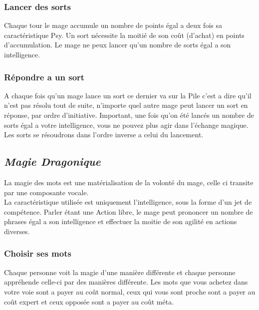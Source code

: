 \subsubsection{Lancer des sorts}
Chaque tour le mage accumule un nombre de points égal a deux fois sa caractéristique Psy. 
Un sort nécessite la moitié de son coût (d’achat) en points d’accumulation. 
Le mage ne peux lancer qu’un nombre de sorts égal a son intelligence.

\subsubsection{Répondre a un sort}
A chaque fois qu’un mage lance un sort ce dernier va sur la Pile c’est a dire qu’il n’est pas résolu tout de suite, 
n'importe quel autre mage peut lancer un sort en réponse, par ordre d’initiative.
Important, une fois qu’on été lancés un nombre de sorts égal a votre intelligence, vous ne pouvez plus agir dans l'échange magique.
Les sorts se résoudrons dans l’ordre inverse a celui du lancement.

\subsection{\em Magie Dragonique}
La magie des mots est une matérialisation de la volonté du mage, celle ci transite par une composante vocale.\\
La caractéristique utilisée est uniquement l'intelligence, sous la forme d’un jet de compétence. 
Parler étant une Action libre, le mage peut prononcer un nombre de phrases égal a son intelligence et effectuer la moitie de son agilité en actions diverses.

\subsubsection{Choisir ses mots}
Chaque personne voit la magie d’une manière différente et chaque personne appréhende celle-ci par des manières différente.
Les mots que vous achetez dans votre voie sont a payer au coût normal, 
ceux qui vous sont proche sont a payer au coût expert et ceux opposée sont a payer au coût méta.
